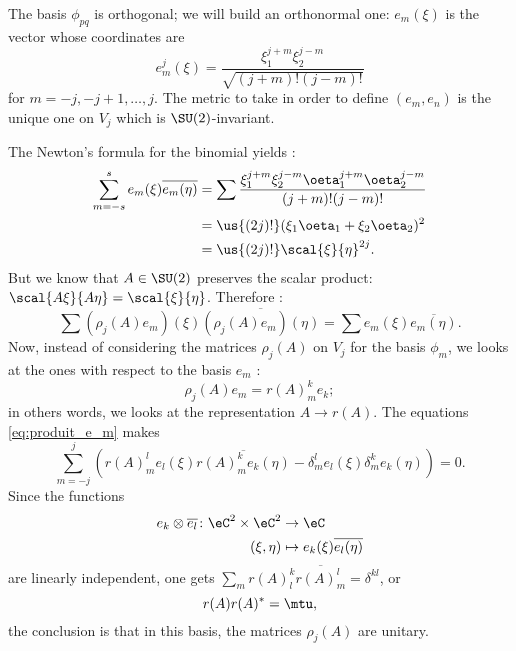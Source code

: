 The basis $\phi_{pq}$ is orthogonal; we will build an orthonormal one: $e_m(\xi)$ is the vector whose coordinates are
\begin{equation}
e_m^j(\xi)=\frac{ \xi_1^{j+m}\xi_2^{j-m} }{\sqrt{ (j+m)!(j-m)! }}
\end{equation}
for $m=-j,-j+1,\ldots,j$. The metric to take in order to define $(e_m,e_n)$ is the unique one on $V_j$ which is $\SU(2)$-invariant.

The Newton's formula for the binomial yields :
\begin{equation}
\begin{split}
  \sum_{m=-s}^s e_m(\xi)\overline{e_m(\eta)}
        &=\sum\frac{ \xi_1^{j+m}\xi_2^{j-m}\oeta_1^{j+m}\oeta_2^{j-m} }{(j+m)!(j-m)!}\\
	&=\us{(2j)!}(\xi_1\oeta_1+\xi_2\oeta_2)^2\\
	&=\us{(2j)!}\scal{\xi}{\eta}^{2j}.
\end{split}
\end{equation}
But we know that $A\in\SU(2)$ preserves the scalar product: $\scal{A\xi}{A\eta}=\scal{\xi}{\eta}$. Therefore :
\begin{equation}\label{eq:produit_e_m}
\sum (\rho_j(A)e_m)(\xi)\overline{ (\rho_j(A)e_m)(\eta) }=\sum e_m(\xi)\overline{e_m(\eta)}.
\end{equation}
Now, instead of considering the matrices $\rho_j(A)$ on $V_j$ for the basis $\phi_m$, we looks at the ones with respect to the basis $e_m$ :
\begin{equation}
\rho_j(A)e_m=r(A)^k_me_k;
\end{equation}
in others words, we looks at the representation $A\to r(A)$. The equations \eqref{eq:produit_e_m} makes
\[
  \sum_{m=-j}^j\left(
                      r(A)^l_me_l(\xi)\overline{ r(A)^k_me_k(\eta)   }
		        -\delta^l_me_l(\xi)\delta^k_me_k(\eta)
                \right)=0.
\]
Since the functions
\begin{equation}
\begin{aligned}
 e_k\otimes\overline{e_l}\colon \eC^2\times\eC^2 &\to \eC \\ 
(\xi,\eta) &\mapsto  e_k(\xi)\overline{e_l(\eta)}
\end{aligned}
\end{equation}
 are linearly independent, one gets $\sum_m r(A)^k_l\overline{r(A)^l_m}=\delta^{kl}$, or
\begin{equation}
r(A)r(A)^*=\mtu,
\end{equation}
the conclusion is that in this basis, the matrices $\rho_j(A)$ are unitary.

